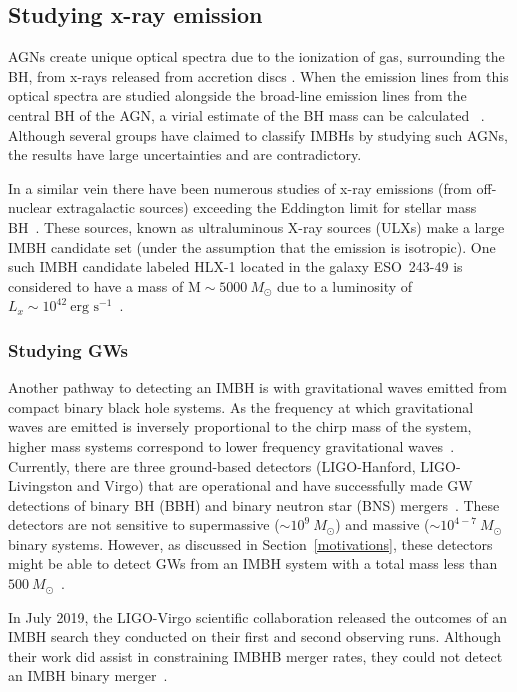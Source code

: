 \subsection{Studying x-ray emission}
AGNs create unique optical spectra due to the ionization of gas,
surrounding the BH, from x-rays released from accretion discs
\citet{elvis2000structure}. When the emission lines from this optical spectra are
studied alongside the broad-line emission lines from the central BH of
the AGN, a virial estimate of the BH mass can be calculated
~\cite{IMBHinLLAGN}. Although several groups have claimed to classify IMBHs
by studying such AGNs, the results have large uncertainties and are
contradictory.

In a similar vein there have been numerous studies of x-ray emissions
(from off-nuclear extragalactic sources) exceeding the Eddington limit
for stellar mass BH~\cite{kaaret2017ultraluminous}. These sources, known as
ultraluminous X-ray sources (ULXs) make a large IMBH candidate set
(under the assumption that the emission is isotropic). One such IMBH
candidate labeled HLX-1 located in the galaxy ESO~243-49 is considered
to have a mass of $\text{M}\sim5000\ M_{\odot}$ due to a luminosity of
$L_x\sim10^{42}\ \text{erg s}^{-1}$~\cite{hlx1}.

\subsubsection{Studying GWs}
Another pathway to detecting an IMBH is with gravitational waves emitted
from compact binary black hole systems. As the frequency at which
gravitational waves are emitted is inversely proportional to the chirp
mass of the system, higher mass systems correspond to lower frequency
gravitational waves~\cite{abbott2016properties}. Currently, there are three
ground-based detectors (LIGO-Hanford, LIGO-Livingston and Virgo) that
are operational and have successfully made GW detections of binary BH
(BBH) and binary neutron star (BNS) mergers~\cite{abbott2019gwtc}. 
These detectors are not
sensitive to supermassive ($\sim10^9\ M_{\odot}$) and massive
($\sim10^{4-7}\ M_{\odot}$ binary systems. However, as discussed
in Section~\ref{motivations}, these detectors might be able to detect
GWs from an IMBH system with a total mass less than $500\
M_{\odot}$~\cite{salemi2019search}.

In July 2019, the LIGO-Virgo scientific collaboration released the
outcomes of an IMBH search they conducted on their first and second
observing runs. Although their work did assist in constraining IMBHB
merger rates, they could not detect an IMBH binary merger~\cite{salemi2019search}.

